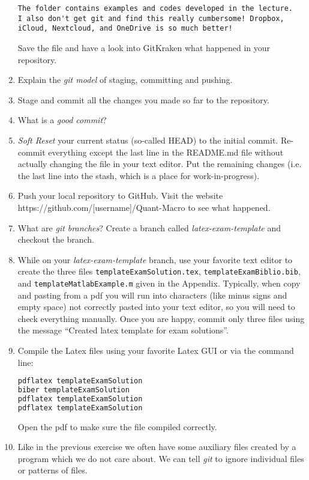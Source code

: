 \begin{enumerate}
\begin{lstlisting}[basicstyle=\scriptsize\mlttfamily]
The folder contains examples and codes developed in the lecture.
I also don't get git and find this really cumbersome! Dropbox, iCloud, Nextcloud, and OneDrive is so much better!
\end{lstlisting}
	Save the file and have a look into GitKraken what happened in your repository.
	\item Explain the \emph{git model} of staging, committing and pushing.
	\item Stage and commit all the changes you made so far to the repository.
	\item What is a \emph{good commit}?
	\item \emph{Soft Reset} your current status (so-called HEAD) to the initial commit.
	Re-commit everything except the last line in the README.md file without actually changing the file in your text editor.
	Put the remaining changes (i.e. the last line into the stash, which is a place for work-in-progress).
	\item Push your local repository to GitHub.
	Visit the website https://github.com/[username]/Quant-Macro to see what happened.
	\item What are \emph{git branches}? Create a branch called \emph{latex-exam-template} and checkout the branch.
	\item While on your \emph{latex-exam-template} branch, use your favorite text editor
	  to create the three files \texttt{templateExamSolution.tex}, \texttt{templateExamBiblio.bib}, and \texttt{templateMatlabExample.m}
	  given in the Appendix.
	  Typically, when copy and pasting from a pdf you will run into characters (like minus signs and empty space) not correctly pasted into your text editor,
		so you will need to check everything manually.
      Once you are happy, commit only three files using the message \enquote{Created latex template for exam solutions}.
	\item Compile the Latex files using your favorite Latex GUI or via the command line:
\begin{lstlisting}[language=tex,frame=single,basicstyle=\scriptsize\mlttfamily]
pdflatex templateExamSolution
biber templateExamSolution
pdflatex templateExamSolution
pdflatex templateExamSolution
\end{lstlisting}
Open the pdf to make sure the file compiled correctly.
	\item Like in the previous exercise we often have some auxiliary files created by a program which we do not care about.
	We can tell \emph{git} to ignore individual files or patterns of files.

\end{enumerate}
